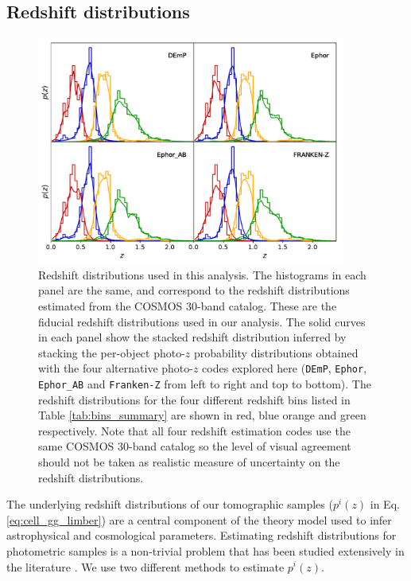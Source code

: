 \documentclass[a4paper,11pt]{article}
\begin{document}
  \subsection{Redshift distributions}\label{ssec:methods.nz}
    \begin{figure}
      \centering
      \includegraphics[width=0.9\textwidth]{figures/nzs.pdf}
      \caption{Redshift distributions used in this analysis. The histograms in each panel are the same, and correspond to the redshift distributions estimated from the COSMOS 30-band catalog. These are the fiducial redshift distributions used in our analysis. The solid curves in each panel show the stacked redshift distribution inferred by stacking the per-object photo-$z$ probability distributions obtained with the four alternative photo-$z$ codes explored here ({\tt DEmP}, {\tt Ephor}, {\tt Ephor\_AB} and {\tt Franken-Z} from left to right and top to bottom). The redshift distributions for the four different redshift bins listed in Table \ref{tab:bins_summary} are shown in red, blue orange and green respectively. Note that all four redshift estimation codes use the same COSMOS 30-band catalog so the level of visual agreement should not be taken as realistic measure of uncertainty on the redshift distributions.}
      \label{fig:nzs}
    \end{figure}
    The underlying redshift distributions of our tomographic samples ($p^i(z)$ in Eq. \ref{eq:cell_gg_limber}) are a central component of the theory model used to infer astrophysical and cosmological parameters. Estimating redshift distributions for photometric samples is a non-trivial problem that has been studied extensively in the literature \citep{2008MNRAS.390..118L,2008ApJ...684...88N,2018MNRAS.478..592H}. We use two different methods to estimate $p^i(z)$.
    
\end{document}
